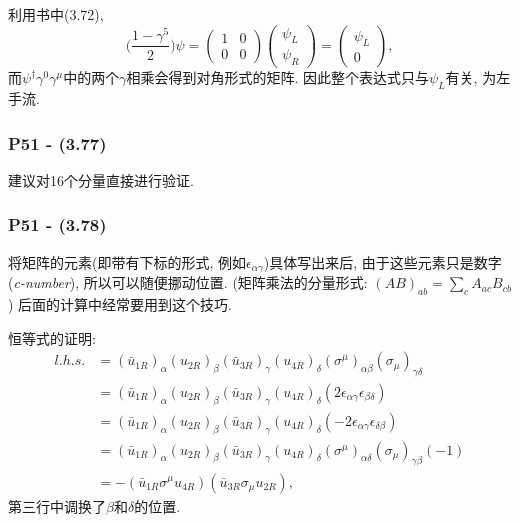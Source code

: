 \documentclass[cn,hazy,blue,11pt,device=normal,chinesefont=founder]{elegantnote}
\begin{document}
利用书中(3.72), 
\begin{equation}
  \biggl( \frac{1 - \gamma^5}{2} \biggr) \psi = \left( \begin{array}{cc} 1 & 0 \\ 0 & 0 \end{array} \right) \left( \begin{array}{c} \psi_L \\ \psi_R \end{array} \right) = \left( \begin{array}{c} \psi_L \\ 0 \end{array} \right), 
\end{equation}
而$\psi^\dagger \gamma^0 \gamma^\mu$中的两个$\gamma$相乘会得到对角形式的矩阵. 因此整个表达式只与$\psi_L$有关, 为左手流. 

\subsubsection{P51 - (3.77)}

建议对16个分量直接进行验证. 

\subsubsection{P51 - (3.78)}

将矩阵的元素(即带有下标的形式, 例如$\epsilon_{\alpha \gamma}$)具体写出来后, 由于这些元素只是数字(\textit{c-number}), 所以可以随便挪动位置. (矩阵乘法的分量形式: $(AB)_{ab} = \sum_c A_{ac} B_{cb}$) 后面的计算中经常要用到这个技巧. 

恒等式的证明: 
\begin{equation}
  \begin{aligned}
    l.h.s. &= (\bar{u}_{1R})_\alpha (u_{2R})_\beta (\bar{u}_{3R})_\gamma (u_{4R})_\delta (\sigma^{\mu})_{\alpha\beta} (\sigma_{\mu})_{\gamma\delta} \\
    &= (\bar{u}_{1R})_\alpha (u_{2R})_\beta (\bar{u}_{3R})_\gamma (u_{4R})_\delta (2\epsilon_{\alpha\gamma} \epsilon_{\beta\delta}) \\
    &= (\bar{u}_{1R})_\alpha (u_{2R})_\beta (\bar{u}_{3R})_\gamma (u_{4R})_\delta (-2\epsilon_{\alpha\gamma} \epsilon_{\delta\beta}) \\
    &= (\bar{u}_{1R})_\alpha (u_{2R})_\beta (\bar{u}_{3R})_\gamma (u_{4R})_\delta (\sigma^{\mu})_{\alpha\delta} (\sigma_{\mu})_{\gamma\beta} (-1) \\
    &= -(\bar{u}_{1R} \sigma^{\mu} u_{4R})(\bar{u}_{3R} \sigma_{\mu} u_{2R}), 
  \end{aligned}
\end{equation}
第三行中调换了$\beta$和$\delta$的位置. 
\end{document}
